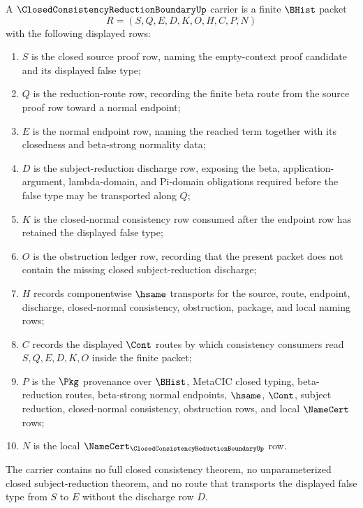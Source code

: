 \begin{definition}
\label{def:closed-consistency-reduction-boundary-carrier}
A $\ClosedConsistencyReductionBoundaryUp$ carrier is a finite $\BHist$ packet
$$
R=(S,Q,E,D,K,O,H,C,P,N)
$$
with the following displayed rows:
\begin{enumerate}
\item $S$ is the closed source proof row, naming the empty-context proof
candidate and its displayed false type;
\item $Q$ is the reduction-route row, recording the finite beta route from the
source proof row toward a normal endpoint;
\item $E$ is the normal endpoint row, naming the reached term together with its
closedness and beta-strong normality data;
\item $D$ is the subject-reduction discharge row, exposing the beta,
application-argument, lambda-domain, and Pi-domain obligations required before
the false type may be transported along $Q$;
\item $K$ is the closed-normal consistency row consumed after the endpoint row
has retained the displayed false type;
\item $O$ is the obstruction ledger row, recording that the present packet does
not contain the missing closed subject-reduction discharge;
\item $H$ records componentwise $\hsame$ transports for the source, route,
endpoint, discharge, closed-normal consistency, obstruction, package, and local
naming rows;
\item $C$ records the displayed $\Cont$ routes by which consistency consumers
read $S,Q,E,D,K,O$ inside the finite packet;
\item $P$ is the $\Pkg$ provenance over $\BHist$, MetaCIC closed typing,
beta-reduction routes, beta-strong normal endpoints, $\hsame$, $\Cont$, subject
reduction, closed-normal consistency, obstruction rows, and local
$\NameCert$ rows;
\item $N$ is the local
$\NameCert_{\ClosedConsistencyReductionBoundaryUp}$ row.
\end{enumerate}
The carrier contains no full closed consistency theorem, no unparameterized
closed subject-reduction theorem, and no route that transports the displayed
false type from $S$ to $E$ without the discharge row $D$.
\end{definition}

